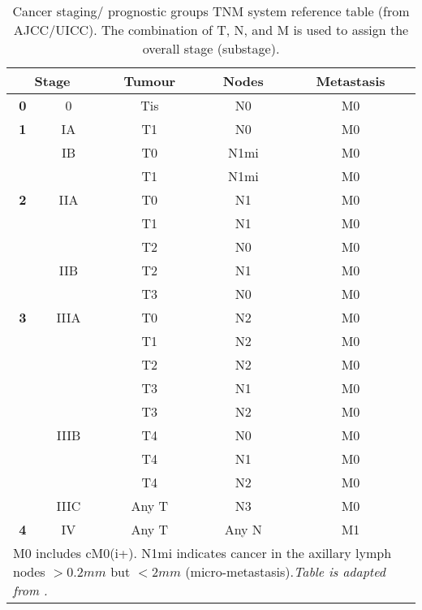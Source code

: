         \begin{table}[!h]
        \centering
        \footnotesize
        \caption[Reference table for cancer staging by TNM system]{Cancer staging/ prognostic groups TNM system reference table (from AJCC/UICC). The combination of T, N, and M is used to assign the  overall stage (substage).}
        \label{table:tnmstage}
        \begin{tabular}{c|c|c|c|c}
        \multicolumn{2}{c|}{\textbf{\small Stage}} & \textbf{Tumour} & \textbf{Nodes} & \textbf{Metastasis} \\ \hline
        \textbf{0} & 0 & Tis & N0 & M0 \\ \hline
        \textbf{1} & IA & T1 & N0 & M0 \\ \hline
        \textbf{} & IB & T0 & N1mi & M0 \\ \cline{2-5} 
        \textbf{} &  & T1 & N1mi & M0 \\ \hline
        \textbf{2} & IIA & T0 & N1 & M0 \\ \hline
        \textbf{} &  & T1 & N1 & M0 \\ \cline{2-5} 
        \textbf{} &  & T2 & N0 & M0 \\ \cline{2-5} 
        \textbf{} & IIB & T2 & N1 & M0 \\ \cline{2-5} 
        \textbf{} &  & T3 & N0 & M0 \\ \hline
        \textbf{3} & IIIA & T0 & N2 & M0 \\ \hline
         &  & T1 & N2 & M0 \\ \cline{2-5} 
         &  & T2 & N2 & M0 \\ \cline{2-5} 
         &  & T3 & N1 & M0 \\ \cline{2-5} 
         &  & T3 & N2 & M0 \\ \cline{2-5} 
         & IIIB & T4 & N0 & M0 \\ \cline{2-5} 
         &  & T4 & N1 & M0 \\ \cline{2-5} 
         &  & T4 & N2 & M0 \\ \cline{2-5} 
         & IIIC & Any T & N3 & M0 \\ \hline
        \textbf{4} & IV & Any T & Any N & M1 \\ \hline
        
        \hline
        \multicolumn{5}{l}{%
          \begin{minipage}{6cm}%
            \tiny M0 includes cM0(i+). N1mi indicates cancer in the axillary lymph nodes  $>0.2mm$ but $<2mm$ (micro-metastasis).\textit{Table is adapted from \cite{Giuliano2017}.} 
          \end{minipage}%
        }\\
        \end{tabular}
        \end{table}


